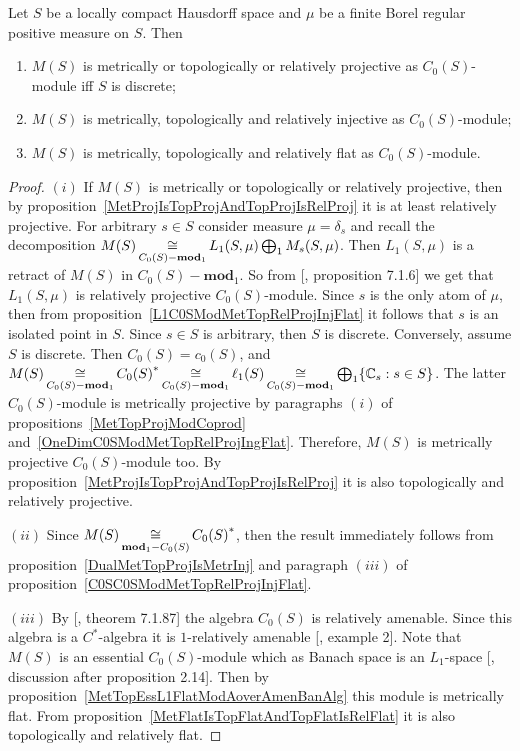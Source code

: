 \begin{proposition}\label{MSC0SModMetTopRelProjIngFlat} Let $S$ be a locally
compact Hausdorff space and $\mu$ be a finite Borel regular positive measure on
$S$. Then

\begin{enumerate}[label = (\roman*)]
    \item $M(S)$ is metrically or topologically or relatively projective as
    $C_0(S)$-module iff $S$ is discrete; 

    \item $M(S)$ is metrically, topologically and relatively injective as
    $C_0(S)$-module; 

    \item $M(S)$ is metrically, topologically and relatively flat as
    $C_0(S)$-module.
\end{enumerate}
\end{proposition}
\begin{proof} $(i)$ If $M(S)$ is metrically or topologically or relatively
projective, then by proposition~\ref{MetProjIsTopProjAndTopProjIsRelProj} it is
at least relatively projective. For arbitrary $s\in S$ consider measure
$\mu=\delta_s$ and recall the decomposition
$M(S)\mathop{\mathbin{\cong}}\limits_{C_0(S)-\mathbf{mod}_1}L_1(S,\mu)\bigoplus_1 M_s(S,\mu)$. Then
$L_1(S,\mu)$ is a retract of $M(S)$ in $C_0(S)-\mathbf{mod}_1$. So from
[\cite{HelBanLocConvAlg}, proposition 7.1.6] we get that $L_1(S,\mu)$ is
relatively projective $C_0(S)$-module. Since $s$ is the only atom of $\mu$, then
from proposition~\ref{L1C0SModMetTopRelProjInjFlat} it follows that $s$ is an
isolated point in $S$. Since $s\in S$ is arbitrary, then $S$ is discrete.
Conversely, assume $S$ is discrete. Then $C_0(S)=c_0(S)$, and
$M(S)
\mathop{\mathbin{\cong}}\limits_{C_0(S)-\mathbf{mod}_1}{C_0(S)}^*
\mathop{\mathbin{\cong}}\limits_{C_0(S)-\mathbf{mod}_1}\ell_1(S)
\mathop{\mathbin{\cong}}\limits_{C_0(S)-\mathbf{mod}_1}
\bigoplus_1 \{\mathbb{C}_s:s\in S \}$. The latter $C_0(S)$-module is metrically
projective by paragraphs $(i)$ of propositions~\ref{MetTopProjModCoprod}
and~\ref{OneDimC0SModMetTopRelProjIngFlat}. Therefore, $M(S)$ is metrically
projective $C_0(S)$-module too. By
proposition~\ref{MetProjIsTopProjAndTopProjIsRelProj} it is also topologically
and relatively projective.

$(ii)$ Since $M(S)\mathop{\mathbin{\cong}}\limits_{\mathbf{mod}_1-C_0(S)}{C_0(S)}^*$, then the result
immediately follows from proposition~\ref{DualMetTopProjIsMetrInj} and paragraph
$(iii)$ of proposition~\ref{C0SC0SModMetTopRelProjInjFlat}.

$(iii)$ By [\cite{HelBanLocConvAlg}, theorem 7.1.87] the algebra $C_0(S)$ is
relatively amenable. Since this algebra is a $C^*$-algebra it is $1$-relatively 
amenable [\cite{RundeAmenConstFour}, example 2]. Note that $M(S)$ is 
an essential $C_0(S)$-module which as Banach space is an $L_1$-space
[\cite{DalLauSecondDualOfMeasAlg}, discussion after proposition 2.14]. Then by
proposition~\ref{MetTopEssL1FlatModAoverAmenBanAlg} this module is metrically
flat. From proposition~\ref{MetFlatIsTopFlatAndTopFlatIsRelFlat} it is also
topologically and relatively flat.
\end{proof}

